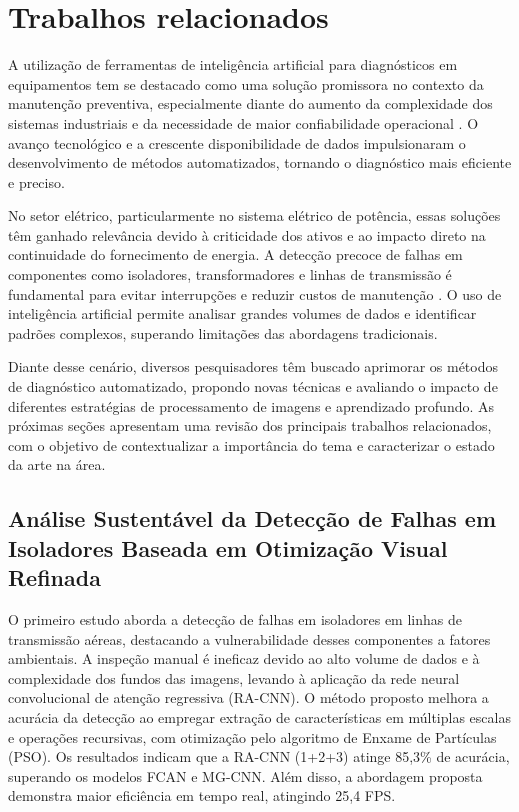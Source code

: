 \chapter{Trabalhos relacionados}
\label{chap:trabalhos_relacionados}

A utilização de ferramentas de inteligência artificial para diagnósticos em equipamentos tem se destacado como uma solução promissora no contexto da manutenção preventiva, especialmente diante do aumento da complexidade dos sistemas industriais e da necessidade de maior confiabilidade operacional \cite{Salvi2021}. O avanço tecnológico e a crescente disponibilidade de dados impulsionaram o desenvolvimento de métodos automatizados, tornando o diagnóstico mais eficiente e preciso.

No setor elétrico, particularmente no sistema elétrico de potência, essas soluções têm ganhado relevância devido à criticidade dos ativos e ao impacto direto na continuidade do fornecimento de energia. A detecção precoce de falhas em componentes como isoladores, transformadores e linhas de transmissão é fundamental para evitar interrupções e reduzir custos de manutenção \cite{wang2023}. O uso de inteligência artificial permite analisar grandes volumes de dados e identificar padrões complexos, superando limitações das abordagens tradicionais.

Diante desse cenário, diversos pesquisadores têm buscado aprimorar os métodos de diagnóstico automatizado, propondo novas técnicas e avaliando o impacto de diferentes estratégias de processamento de imagens e aprendizado profundo. As próximas seções apresentam uma revisão dos principais trabalhos relacionados, com o objetivo de contextualizar a importância do tema e caracterizar o estado da arte na área.

\section{Análise Sustentável da Detecção de Falhas em Isoladores Baseada em Otimização Visual Refinada}
O primeiro estudo aborda a detecção de falhas em isoladores em linhas de transmissão aéreas, destacando a vulnerabilidade desses componentes a fatores ambientais. A inspeção manual é ineficaz devido ao alto volume de dados e à complexidade dos fundos das imagens, levando à aplicação da rede neural convolucional de atenção regressiva (RA-CNN). O método proposto melhora a acurácia da detecção ao empregar extração de características em múltiplas escalas e operações recursivas, com otimização pelo algoritmo de Enxame de Partículas (PSO). Os resultados indicam que a RA-CNN (1+2+3) atinge 85,3\% de acurácia, superando os modelos FCAN e MG-CNN. Além disso, a abordagem proposta demonstra maior eficiência em tempo real, atingindo 25,4 FPS. \cite{wang2023}

